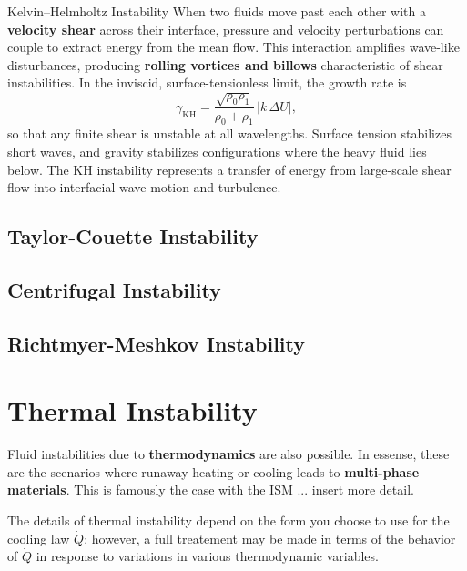 \begin{bigidea}{Kelvin--Helmholtz Instability}
When two fluids move past each other with a \textbf{velocity shear} across their interface, pressure and velocity perturbations can couple to extract energy from the mean flow. 
This interaction amplifies wave-like disturbances, producing \textbf{rolling vortices and billows} characteristic of shear instabilities.  
In the inviscid, surface-tensionless limit, the growth rate is
\[
\gamma_{\mathrm{KH}} = \frac{\sqrt{\rho_0 \rho_1}}{\rho_0 + \rho_1}\,|k\,\Delta U|,
\]
so that any finite shear is unstable at all wavelengths.  
Surface tension stabilizes short waves, and gravity stabilizes configurations where the heavy fluid lies below.  
The KH instability represents a transfer of energy from large-scale shear flow into interfacial wave motion and turbulence.
\end{bigidea}

\subsection{Taylor-Couette Instability}

\subsection{Centrifugal Instability}

\subsection{Richtmyer-Meshkov Instability}

\section{Thermal Instability}
Fluid instabilities due to \textbf{thermodynamics} are also possible. In essense, these are the scenarios where runaway heating or cooling leads to \textbf{multi-phase materials}. This is famously the case with the ISM ... insert more detail.

The details of thermal instability depend on the form you choose to use for the cooling law $\dot{Q}$; however, a full treatement may be made in terms of the behavior of $\dot{Q}$ in response to variations in various thermodynamic variables.

